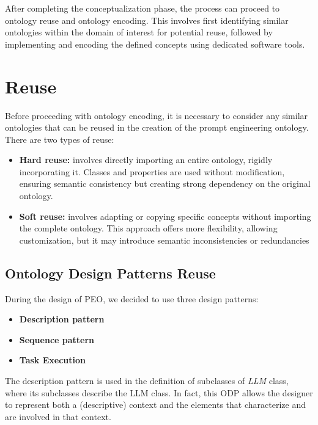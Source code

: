 After completing the conceptualization phase, the process can proceed to ontology reuse and ontology encoding.
This involves first identifying similar ontologies within the domain of interest for potential reuse, followed by implementing and encoding the defined concepts using dedicated software tools.

\section{Reuse}
\label{section:4_2_reuse}
Before proceeding with ontology encoding, it is necessary to consider any similar ontologies that can be reused in the creation of the prompt engineering ontology. There are two types of reuse:
\begin{itemize}
    \item \textbf{Hard reuse:} involves directly importing an entire ontology, rigidly incorporating it. Classes and properties are used without modification, ensuring semantic consistency but creating strong dependency on the original ontology.

    \item \textbf{Soft reuse:} involves adapting or copying specific concepts without importing the complete ontology. This approach offers more flexibility, allowing customization, but it may introduce semantic inconsistencies or redundancies 
\end{itemize}

\subsection{Ontology Design Patterns Reuse}
\label{subsection:4_2_1_design_patterns}
During the design of PEO, we decided to use three design patterns:
\begin{itemize}
    \item \textbf{Description pattern}
    \item \textbf{Sequence pattern}
    \item \textbf{Task Execution}
\end{itemize}

The description pattern is used in the definition of subclasses of \textit{LLM} class, where its subclasses describe the LLM class.\cite{description_pattern}
In fact, this ODP allows the designer to represent both a (descriptive) context and the elements that characterize and are involved in that context.

